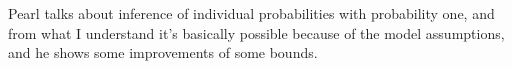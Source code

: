 Pearl talks about inference of individual probabilities with probability one, and from what I understand it's basically possible because of the model assumptions, and he shows some improvements of some bounds.
